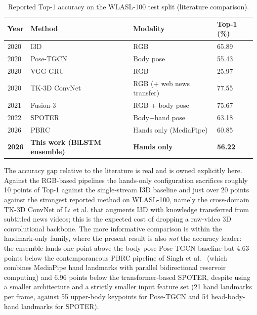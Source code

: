 \begin{table}[!ht]
\centering
\caption{Reported Top-1 accuracy on the WLASL-100 test split (literature comparison).}
\label{tab:results-wlasl-lit}
\begin{tabular}{llll}
\toprule
\textbf{Year} & \textbf{Method} & \textbf{Modality} & \textbf{Top-1 (\%)} \\
\midrule
2020 & I3D~\cite{li2020wlasl}              & RGB                & 65.89 \\
2020 & Pose-TGCN~\cite{li2020wlasl}        & Body pose          & 55.43 \\
2020 & VGG-GRU~\cite{li2020wlasl}          & RGB                & 25.97 \\
2020 & TK-3D ConvNet~\cite{li2020transferring} & RGB (+ web news transfer) & 77.55 \\
2021 & Fusion-3~\cite{hosain2021fusion}    & RGB + body pose    & 75.67 \\
2022 & SPOTER~\cite{bohacek2022spoter}     & Body+hand pose     & 63.18 \\
2026 & PBRC~\cite{singh2026pbrc}           & Hands only (MediaPipe) & 60.85 \\
\midrule
\textbf{2026} & \textbf{This work (BiLSTM ensemble)} & \textbf{Hands only} & \textbf{56.22} \\
\bottomrule
\end{tabular}
\end{table}

The accuracy gap relative to the literature is real and is owned
explicitly here. Against the RGB-based pipelines the hands-only
configuration sacrifices roughly 10 points of Top-1 against the
single-stream I3D baseline and just over 20 points against the
strongest reported method on WLASL-100, namely the cross-domain
TK-3D ConvNet of Li et al. that augments I3D with knowledge
transferred from subtitled news videos; this is the expected cost
of dropping a raw-video 3D convolutional backbone. The more
informative comparison is within the landmark-only family, where
the present result is also \emph{not} the accuracy leader: the
ensemble lands one point above the body-pose Pose-TGCN baseline
but \SI{4.63}{} points below the contemporaneous PBRC pipeline of
Singh et al.~\cite{singh2026pbrc} (which combines MediaPipe hand
landmarks with parallel bidirectional reservoir computing) and
\SI{6.96}{} points below the transformer-based SPOTER, despite
using a smaller architecture and a strictly smaller input feature
set (21 hand landmarks per frame, against 55 upper-body keypoints
for Pose-TGCN and 54 head-body-hand landmarks for SPOTER).

